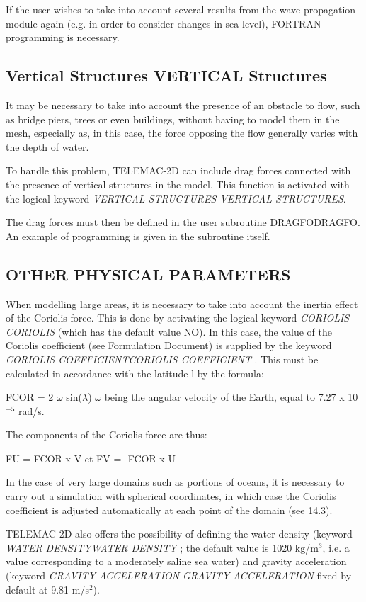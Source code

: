 \documentclass{article} %
\begin{document}
 If the user wishes to take into account several results from the wave propagation module again (e.g. in order to consider changes in sea level), FORTRAN programming is necessary.


\subsection{ Vertical Structures VERTICAL Structures}

 It may be necessary to take into account the presence of an obstacle to flow, such as bridge piers, trees or even buildings, without having to model them in the mesh, especially as, in this case, the force opposing the flow generally varies with the depth of water.

 To handle this problem, TELEMAC-2D can include drag forces connected with the presence of vertical structures in the model. This function is activated with the logical keyword \textit{VERTICAL STRUCTURES VERTICAL STRUCTURES}.

 The drag forces must then be defined in the user subroutine DRAGFODRAGFO. An example of programming is given in the subroutine itself.


\subsection{ OTHER PHYSICAL PARAMETERS}

 When modelling large areas, it is necessary to take into account the inertia effect of the Coriolis force. This is done by activating the logical keyword \textit{CORIOLIS} \textit{CORIOLIS}  (which has the default value NO). In this case, the value of the Coriolis coefficient (see Formulation Document) is supplied by the keyword \textit{CORIOLIS COEFFICIENTCORIOLIS COEFFICIENT }. This must be calculated in accordance with the latitude l by the formula:

 FCOR = 2 $\omega$ sin($\lambda$)          $\omega$ being the angular velocity of the Earth, equal to 7.27 x 10${}^{-5}$ rad/s.

 The components of the Coriolis force are thus:

 FU = FCOR x V         et         FV = -FCOR x U

 In the case of very large domains such as portions of oceans, it is necessary to carry out a simulation with spherical coordinates, in which case the Coriolis coefficient is adjusted automatically at each point of the domain (see 14.3).

 TELEMAC-2D also offers the possibility of defining the water density (keyword \textit{WATER DENSITYWATER DENSITY} ; the default value is 1020 kg/m${}^{3}$, i.e. a value corresponding to a moderately saline sea water) and gravity acceleration (keyword \textit{GRAVITY} \textit{ACCELERATION} \textit{GRAVITY ACCELERATION} fixed by default at 9.81 m/s${}^{2}$).
\end{document}
